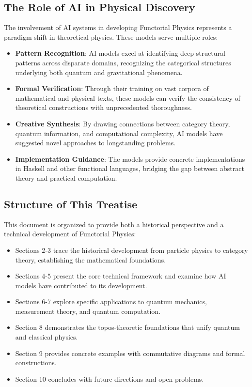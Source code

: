 \subsection{The Role of AI in Physical Discovery}

The involvement of AI systems in developing Functorial Physics represents a paradigm shift in theoretical physics. These models serve multiple roles:

\begin{itemize}[leftmargin=*]
\item \textbf{Pattern Recognition}: AI models excel at identifying deep structural patterns across disparate domains, recognizing the categorical structures underlying both quantum and gravitational phenomena.

\item \textbf{Formal Verification}: Through their training on vast corpora of mathematical and physical texts, these models can verify the consistency of theoretical constructions with unprecedented thoroughness.

\item \textbf{Creative Synthesis}: By drawing connections between category theory, quantum information, and computational complexity, AI models have suggested novel approaches to longstanding problems.

\item \textbf{Implementation Guidance}: The models provide concrete implementations in Haskell and other functional languages, bridging the gap between abstract theory and practical computation.
\end{itemize}

\subsection{Structure of This Treatise}

This document is organized to provide both a historical perspective and a technical development of Functorial Physics:

\begin{itemize}[leftmargin=*]
\item Sections 2-3 trace the historical development from particle physics to category theory, establishing the mathematical foundations.

\item Sections 4-5 present the core technical framework and examine how AI models have contributed to its development.

\item Sections 6-7 explore specific applications to quantum mechanics, measurement theory, and quantum computation.

\item Section 8 demonstrates the topos-theoretic foundations that unify quantum and classical physics.

\item Section 9 provides concrete examples with commutative diagrams and formal constructions.

\item Section 10 concludes with future directions and open problems.
\end{itemize}

